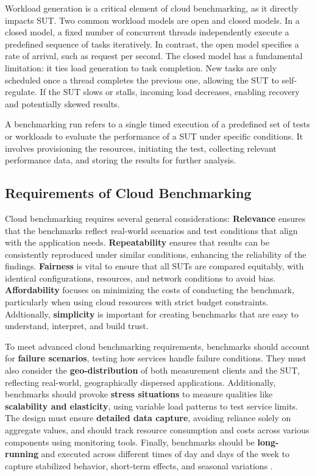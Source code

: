 Workload generation is a critical element of cloud benchmarking, as it directly impacts SUT. Two common workload models are open and closed models. In a closed model, a fixed number of concurrent threads independently execute a predefined sequence of tasks iteratively. In contrast, the open model specifies a rate of arrival, such as request per second. The closed model has a fundamental limitation: it ties load generation to task completion. New tasks are only scheduled once a thread completes the previous one, allowing the SUT to self-regulate. If the SUT slows or stalls, incoming load decreases, enabling recovery and potentially skewed results.

A benchmarking run refers to a single timed execution of a predefined set of tests or workloads to evaluate the performance of a SUT under specific conditions. It involves provisioning the resources, initiating the test, collecting relevant performance data, and storing the results for further analysis.

\subsection{Requirements of Cloud Benchmarking}

Cloud benchmarking requires several general considerations: \textbf{Relevance} ensures that the benchmarks reflect real-world scenarios and test conditions that align with the application needs. \textbf{Repeatability} ensures that results can be consistently reproduced under similar conditions, enhancing the reliability of the findings. \textbf{Fairness} is vital to ensure that all SUTs are compared equitably, with identical configurations, resources, and network conditions to avoid bias. \textbf{Affordability} focuses on minimizing the costs of conducting the benchmark, particularly when using cloud resources with strict budget constraints. Addtionally, \textbf{simplicity} is important for creating benchmarks that are easy to understand, interpret, and build trust.

To meet advanced cloud benchmarking requirements, benchmarks should account for \textbf{failure scenarios}, testing how services handle failure conditions. They must also consider the \textbf{geo-distribution} of both measurement clients and the SUT, reflecting real-world, geographically dispersed applications. Additionally, benchmarks should provoke \textbf{stress situations} to measure qualities like \textbf{scalability and elasticity}, using variable load patterns to test service limits. The design must ensure \textbf{detailed data capture}, avoiding reliance solely on aggregate values, and should track resource consumption and costs across various components using monitoring tools. Finally, benchmarks should be \textbf{long-running} and executed across different times of day and days of the week to capture stabilized behavior, short-term effects, and seasonal variations \cite{book_bermbach_cloud_service_benchmarking}.

